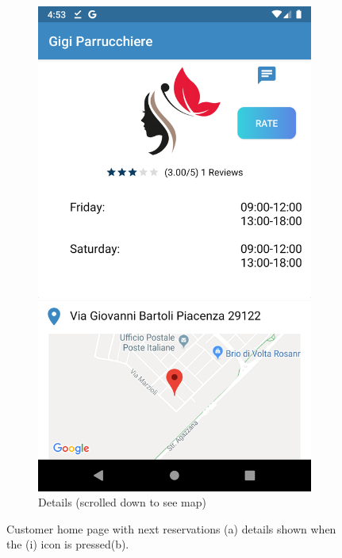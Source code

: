 \begin{figure}[h]
\begin{subfigure}{.5\textwidth}
  \includegraphics[height=.4\textheight, keepaspectratio=true]{Img/Screens/Customer_Home_Details}
  \caption{Details (scrolled down to see map)}
\end{subfigure}
\caption{Customer home page with next reservations (a) details shown when the (i) icon is pressed(b).}
\end{figure}

